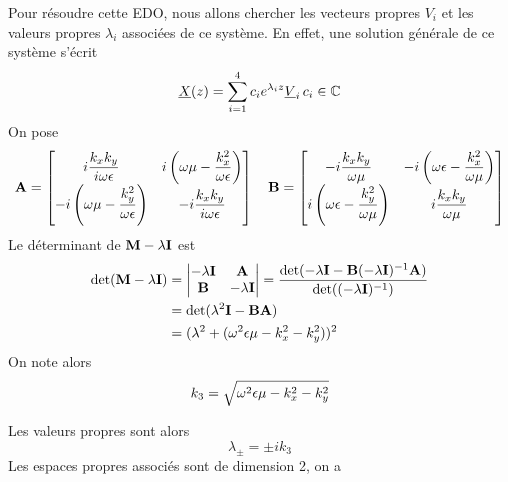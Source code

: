     Pour résoudre cette EDO, nous allons chercher les vecteurs propres $V_i$ et les valeurs propres $\lambda_i$ associées de ce système. En effet, une solution générale de ce système s'écrit
    \begin{equation}
        \underline{X}(z)= \sum\limits_{i=1}^{4}c_i e^{\lambda_i z} \underline{V}_i \, c_i \in \mathbb C
    \end{equation}
    On pose 
    \begin{equation}
        \mathbf{A} = \begin{bmatrix}
            i\dfrac{k_xk_y}{i\omega\epsilon} & i\left(\omega\mu - \dfrac{k_x^2}{\omega\epsilon}\right) \\
            -i\left(\omega\mu - \dfrac{k_y^2}{\omega\epsilon}\right) & -i\dfrac{k_xk_y}{i\omega\epsilon} \\
        \end{bmatrix}
        \quad
        \mathbf{B} = \begin{bmatrix}
            -i\dfrac{k_xk_y}{\omega\mu} & -i\left(\omega\epsilon - \dfrac{k_x^2}{\omega\mu}\right) \\
            i\left(\omega\epsilon - \dfrac{k_y^2}{\omega\mu}\right) & i\dfrac{k_xk_y}{\omega\mu} \\
        \end{bmatrix}
    \end{equation}
    Le déterminant de $\mathbf{M}-\lambda \mathbf{I}$ est
    \begin{align*}
        \det(\mathbf{M}-\lambda \mathbf{I}) &= 
        \begin{vmatrix}
            -\lambda \mathbf{I} & \mathbf{A} \\
            \mathbf{B} & -\lambda \mathbf{I}
        \end{vmatrix}
            = \dfrac{\det(- \lambda \mathbf{I} - \mathbf{B}(-\lambda \mathbf{I})^{-1} \mathbf{A})}{\det((-\lambda \mathbf{I})^{-1})} \\
            &= \det(\lambda^2 \mathbf{I} - \mathbf{B}\mathbf{A}) \\
            &= (\lambda^2 + (\omega^2\epsilon\mu - k_x^2 -k_y^2))^2
    \end{align*}
    On note alors 
    \begin{equation}
    k_3=\sqrt{\omega^2\epsilon\mu - k_x^2 -k_y^2}
    \end{equation}

    Les valeurs propres sont alors 
    \begin{equation}
        \lambda_\pm = \pm i k_3
    \end{equation}
    Les espaces propres associés sont de dimension 2, on a 

